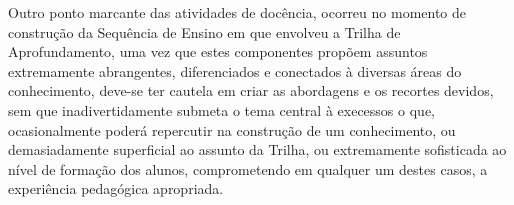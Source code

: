 Outro ponto marcante das atividades de docência, ocorreu no momento de construção da Sequência de Ensino em que envolveu a Trilha de Aprofundamento, uma vez que estes componentes propõem assuntos extremamente abrangentes, diferenciados e conectados à diversas áreas do conhecimento, deve-se ter cautela em criar as abordagens e os recortes devidos, sem que inadivertidamente submeta o tema central à execessos o que, ocasionalmente poderá repercutir na construção de um conhecimento, ou demasiadamente superficial ao assunto da Trilha, ou extremamente sofisticada ao nível de formação dos alunos, comprometendo em qualquer um destes casos, a experiência pedagógica apropriada.


%
%


%
%
%

